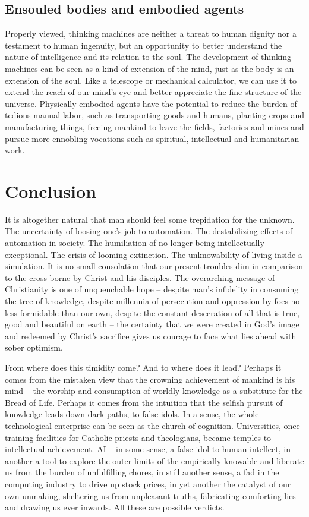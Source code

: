 \documentclass[sigplan,nonacm]{acmart}\settopmatter{printfolios=false,printccs=false,printacmref=false}
\begin{document}
\subsection{Ensouled bodies and embodied agents}

Properly viewed, thinking machines are neither a threat to human dignity nor a testament to human ingenuity, but an opportunity to better understand the nature of intelligence and its relation to the soul. The development of thinking machines can be seen as a kind of extension of the mind, just as the body is an extension of the soul. Like a telescope or mechanical calculator, we can use it to extend the reach of our mind's eye and better appreciate the fine structure of the universe. Physically embodied agents have the potential to reduce the burden of tedious manual labor, such as transporting goods and humans, planting crops and manufacturing things, freeing mankind to leave the fields, factories and mines and pursue more ennobling vocations such as spiritual, intellectual and humanitarian work.

\clearpage\section{Conclusion}

It is altogether natural that man should feel some trepidation for the unknown. The uncertainty of loosing one's job to automation. The destabilizing effects of automation in society. The humiliation of no longer being intellectually exceptional. The crisis of looming extinction. The unknowability of living inside a simulation. It is no small consolation that our present troubles dim in comparison to the cross borne by Christ and his disciples. The overarching message of Christianity is one of unquenchable hope -- despite man's infidelity in consuming the tree of knowledge, despite millennia of persecution and oppression by foes no less formidable than our own, despite the constant desecration of all that is true, good and beautiful on earth -- the certainty that we were created in God's image and redeemed by Christ's sacrifice gives us courage to face what lies ahead with sober optimism.

From where does this timidity come? And to where does it lead? Perhaps it comes from the mistaken view that the crowning achievement of mankind is his mind -- the worship and consumption of worldly knowledge as a substitute for the Bread of Life. Perhaps it comes from the intuition that the selfish pursuit of knowledge leads down dark paths, to false idols. In a sense, the whole technological enterprise can be seen as the church of cognition. Universities, once training facilities for Catholic priests and theologians, became temples to intellectual achievement. AI -- in some sense, a false idol to human intellect, in another a tool to explore the outer limits of the empirically knowable and liberate us from the burden of unfulfilling chores, in still another sense, a fad in the computing industry to drive up stock prices, in yet another the catalyst of our own unmaking, sheltering us from unpleasant truths, fabricating comforting lies and drawing us ever inwards. All these are possible verdicts.
\end{document}
